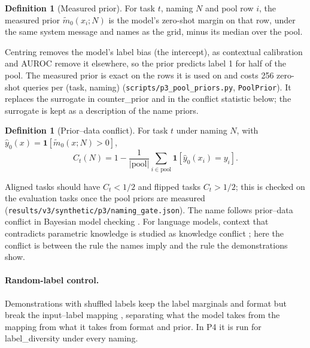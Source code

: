 \documentclass[11pt,a4paper]{article}
\newcommand{\1}{\mathbf{1}}
\theoremstyle{plain}
\theoremstyle{definition}
\newtheorem{definition}[theorem]{Definition}
\theoremstyle{remark}
\begin{document}
\begin{definition}[Measured prior]
For task $t$, naming $N$ and pool row $i$, the measured prior
$\tilde m_0(x_i; N)$ is the model's zero-shot margin on that row, under the
same system message and names as the grid, minus its median over the pool.
\end{definition}
Centring removes the model's label bias (the intercept), as contextual
calibration and AUROC remove it elsewhere, so the prior predicts label 1 for
half of the pool. The measured prior is exact on the rows it is used on and
costs 256 zero-shot queries per (task, naming)
(\texttt{scripts/p3\_pool\_priors.py}, \texttt{PoolPrior}). It replaces the
surrogate in counter\_prior and in the conflict statistic below; the
surrogate is kept as a description of the name priors.

\begin{definition}[Prior--data conflict]
For task $t$ under naming $N$, with $\hat y_0(x) = \1[\tilde m_0(x; N) > 0]$,
\[
  C_t(N) = 1 - \frac{1}{|\text{pool}|} \sum_{i \in \text{pool}}
  \1[\hat y_0(x_i) = y_i].
\]
\end{definition}
Aligned tasks should have $C_t < 1/2$ and flipped tasks $C_t > 1/2$; this
is checked on the evaluation tasks once the pool priors are measured
(\texttt{results/v3/synthetic/p3/naming\_gate.json}). The name follows
prior--data conflict in Bayesian model checking \citep{evans2006checking}.
For language models, context that contradicts parametric knowledge is
studied as knowledge conflict \citep{longpre2021entity,xie2024adaptive};
here the conflict is between the rule the names imply and the rule the
demonstrations show.

\paragraph{Random-label control.} Demonstrations with shuffled labels keep
the label marginals and format but break the input--label mapping
\citep{min2022rethinking}, separating what the model takes from the mapping
from what it takes from format and prior. In P4 it is run for
label\_diversity under every naming.
\end{document}
